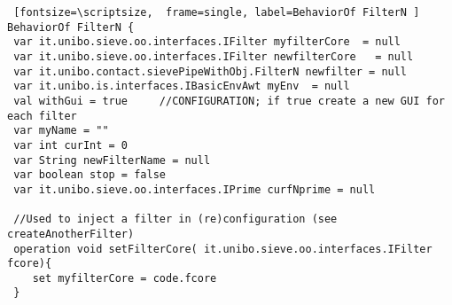 \documentclass{../llncs}
\begin{document}

 
\begin{Verbatim} [fontsize=\scriptsize,  frame=single, label=BehaviorOf FilterN ] 
BehaviorOf FilterN {    
 var it.unibo.sieve.oo.interfaces.IFilter myfilterCore  = null
 var it.unibo.sieve.oo.interfaces.IFilter newfilterCore   = null 	
 var it.unibo.contact.sievePipeWithObj.FilterN newfilter = null 
 var it.unibo.is.interfaces.IBasicEnvAwt myEnv	= null
 val withGui = true 	//CONFIGURATION; if true create a new GUI for each filter
 var myName = "" 
 var int curInt = 0
 var String newFilterName = null
 var boolean stop = false
 var it.unibo.sieve.oo.interfaces.IPrime curfNprime = null
   	
 //Used to inject a filter in (re)configuration (see createAnotherFilter)
 operation void setFilterCore( it.unibo.sieve.oo.interfaces.IFilter fcore){
	set myfilterCore = code.fcore
 }
  

\end{Verbatim}
\end{document}
